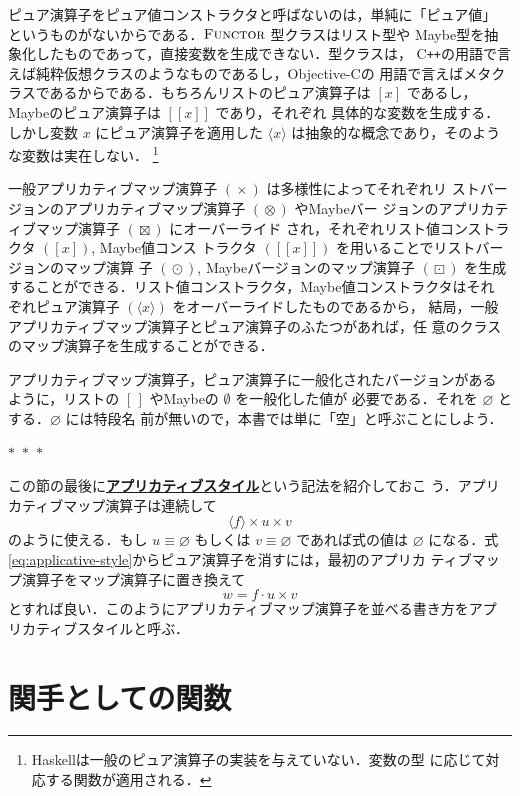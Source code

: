 \documentclass[a5paper,twoside,fleqn,draft]{jsbook}
\def\[{[\![}
\def\]{]\!]}
\newcommand{\separator}{\begin{center}$*$~$*$~$*$\end{center}}
\newcommand{\programminglanguage}[1]{\textsf{#1}}
\newcommand{\cxx}{\programminglanguage{C}\texttt{++}}
\newcommand{\haskell}{\programminglanguage{Haskell}}
\newcommand{\objectivec}{\programminglanguage{Objective-C}}
\newcommand{\keyword}[1]{{\underline{\textbf{#1}}}}
\newcommand{\mEmptyList}{{[\,]}}
\newcommand{\mNothing}{\emptyset}
\newcommand{\mPureNothing}{\varnothing}
\DeclareMathOperator{\mAppMap}{\times}
\DeclareMathOperator{\mAppMapList}{\otimes}
\DeclareMathOperator{\mAppMapMaybe}{\boxtimes}
\DeclareMathOperator{\mMap}{\cdot}
\DeclareMathOperator{\mMapList}{\odot}
\DeclareMathOperator{\mMapMaybe}{\boxdot}
\newcommand{\mValueConstructor}[1]{\mathrm{#1}}
\newcommand{\mValueWith}[2]{{}^\mValueConstructor{#1}\[#2\]}
\newcommand{\mJustWith}[1]{\[#1\]}%
\newcommand{\mPureWith}[1]{\langle#1\rangle}
\newcommand{\mTypeClass}[1]{\textsc{#1}} %
\newcommand{\mFunctorTypeClass}{\mTypeClass{Functor}}
\begin{document}
ピュア演算子をピュア値コンストラクタと呼ばないのは，単純に「ピュア値」
というものがないからである．$\mFunctorTypeClass$ 型クラスはリスト型や
Maybe型を抽象化したものであって，直接変数を生成できない．型クラスは，
\cxx の用語で言えば純粋仮想クラスのようなものであるし，\objectivec の
用語で言えばメタクラスであるからである．もちろんリストのピュア演算子は
$[x]$ であるし，Maybeのピュア演算子は $\mJustWith{x}$ であり，それぞれ
具体的な変数を生成する．しかし変数 $x$ にピュア演算子を適用した
$\mPureWith{x}$ は抽象的な概念であり，そのような変数は実在しない．
\footnote{\haskell は一般のピュア演算子の実装を与えていない．変数の型
  に応じて対応する関数が適用される．}

一般アプリカティブマップ演算子 $(\mAppMap)$ は多様性によってそれぞれリ
ストバージョンのアプリカティブマップ演算子 $(\mAppMapList)$ やMaybeバー
ジョンのアプリカティブマップ演算子 $(\mAppMapMaybe)$ にオーバーライド
され，それぞれリスト値コンストラクタ $([x])$, Maybe値コンス
トラクタ $(\mJustWith{x})$ を用いることでリストバージョンのマップ演算
子 $(\mMapList)$, Maybeバージョンのマップ演算子 $(\mMapMaybe)$ を生成
することができる．リスト値コンストラクタ，Maybe値コンストラクタはそれ
ぞれピュア演算子 $(\mPureWith{x})$ をオーバーライドしたものであるから，
結局，一般アプリカティブマップ演算子とピュア演算子のふたつがあれば，任
意のクラスのマップ演算子を生成することができる．

アプリカティブマップ演算子，ピュア演算子に一般化されたバージョンがある
ように，リストの $\mEmptyList$ やMaybeの $\mNothing$ を一般化した値が
必要である．それを $\mPureNothing$ とする．$\mPureNothing$ には特段名
前が無いので，本書では単に「空」と呼ぶことにしよう．

\separator

この節の最後に\keyword{アプリカティブスタイル}という記法を紹介しておこ
う．アプリカティブマップ演算子は連続して
\begin{equation}
  \label{eq:applicative-style}
  \mPureWith{f}\mAppMap u\mAppMap v
\end{equation}
のように使える．もし $u\equiv\mPureNothing$ もしくは
$v\equiv\mPureNothing$ であれば式の値は $\mPureNothing$ になる．式
\eqref{eq:applicative-style}からピュア演算子を消すには，最初のアプリカ
ティブマップ演算子をマップ演算子に置き換えて
\begin{equation}
  w
  =f\mMap u\mAppMap v
\end{equation}
とすれば良い．このようにアプリカティブマップ演算子を並べる書き方をアプ
リカティブスタイルと呼ぶ．

\section{関手としての関数}
\end{document}

